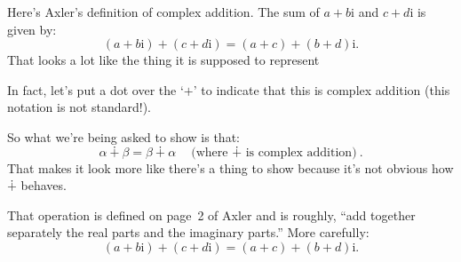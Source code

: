 \documentclass[10pt, a4paper, twocolumn]{article}
\newcommand{\ii}{\mathrm{i}}
\begin{document}
Here's Axler's definition of complex addition. The sum of $a+b\ii$ and $c+d\ii$ is given by:
\begin{equation*}
  (a+b\ii) + (c +d\ii) = (a+c) + (b+d)\ii.
\end{equation*}
That looks a lot like the thing it is supposed to represent



In fact, let's put a dot over the `$+$' to indicate that this is complex addition (this notation is not standard!).

So what we're being asked to show is that:
\begin{equation*}
  \alpha \dotplus \beta = \beta \dotplus \alpha \quad\text{(where $\dotplus$ is complex addition)}.
\end{equation*}
That makes it look more like there's a thing to show because it's not obvious how $\dotplus$ behaves.

That operation is defined on page~2 of Axler and is roughly, ``add together separately the real parts and the imaginary parts.'' More carefully:
\begin{equation*}
  (a + b\ii) + (c + d\ii) = (a+c) + (b+d)\ii.
\end{equation*}
\end{document}
